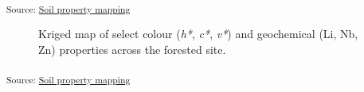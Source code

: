 \documentclass[
  number]{elsarticle}
\begin{document}
\textsubscript{Source:
\href{https://alex-koiter.github.io/spatial-variability-soil-manuscript/notebooks/soil_property_maps.qmd.html\#cell-fig-ag_map2}{Soil
property mapping}}

\begin{figure}[H]


\caption{\label{fig-forest_map}Kriged map of select colour (\emph{h*},
\emph{c*}, \emph{v*}) and geochemical (Li, Nb, Zn) properties across the
forested site.}

\end{figure}%

\textsubscript{Source:
\href{https://alex-koiter.github.io/spatial-variability-soil-manuscript/notebooks/soil_property_maps.qmd.html\#cell-fig-forest_map}{Soil
property mapping}}
\end{document}
